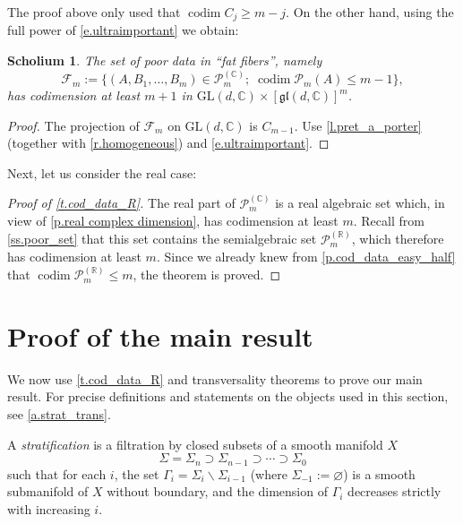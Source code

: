 \documentclass[10pt, a4paper]{amsart}
\theoremstyle{plain}
\newtheorem{scho}[lemma]{Scholium}
\theoremstyle{definition}
\theoremstyle{remark}
\theoremstyle{note}
\numberwithin{equation}{section}
\begin{document}
The proof above only used that $\operatorname{codim} C_j \ge m-j$.
On the other hand, using the full power of \eqref{e.ultraimportant} we obtain: 

\begin{scho}\label{scholium}
The set of poor data in ``fat fibers'', namely
$$
{\mathcal{F}}_m := \big\{ (A, B_1, \dots, B_m)  \in {\mathcal{P}}_m^{({\mathbb{C}})} ; \; \operatorname{codim} {\mathcal{P}}_m(A) \le m-1 \big\},
$$
has codimension at least $m+1$ in ${\mathrm{GL}}(d,{\mathbb{C}}) \times [{\mathfrak{gl}}(d,{\mathbb{C}})]^m$.
\end{scho}

\begin{proof}
The projection of ${\mathcal{F}}_m$ on ${\mathrm{GL}}(d,{\mathbb{C}})$ is $C_{m-1}$.
Use \cref{l.pret_a_porter} (together with \cref{r.homogeneous}) and \eqref{e.ultraimportant}.
\end{proof}

Next, let us consider the real case:

\begin{proof}[Proof of \cref{t.cod_data_R}]
The real part of ${\mathcal{P}}^{({\mathbb{C}})}_m$ is a real algebraic set
which, in view of \cref{p.real complex dimension}, has codimension at least $m$.
Recall from \cref{ss.poor_set} that this set contains the semialgebraic set ${\mathcal{P}}^{({\mathbb{R}})}_m$,
which therefore has codimension at least $m$.
Since we already knew from \cref{p.cod_data_easy_half} that $\operatorname{codim} {\mathcal{P}}^{({\mathbb{R}})}_m \le m$,
the theorem is proved.
\end{proof}

\section{Proof of the main result} \label{s.main proof}
We now use \cref{t.cod_data_R} and transversality theorems to prove our main result.
For precise definitions and statements on the objects used in this section, see \cref{a.strat_trans}.

A \emph{stratification} is a filtration by closed subsets of a smooth manifold $X$
$$
{\Sigma} = {\Sigma}_n \supset {\Sigma}_{n-1} \supset \cdots \supset {\Sigma}_0
$$ 
such that for each $i$, the set $\Gamma_i= {\Sigma}_i {\smallsetminus} {\Sigma}_{i-1}$ (where $\Sigma_{-1}:={\varnothing}$) is a smooth submanifold of $X$ without boundary, and the dimension of $\Gamma_i$ decreases strictly with increasing $i$. 
\end{document}
